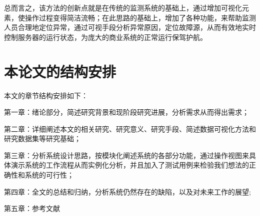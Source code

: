 总而言之，该方法的创新点就是在传统的监测系统的基础上，通过增加可视化元素，使操作过程变得简洁流畅；在此思路的基础上，增加了各种功能，来帮助监测人员合理地定位异常，通过可视手段分析异常原因，定位故障源，从而有效地实时控制服务器的运行状态，为庞大的商业系统的正常运行保驾护航。

\section{本论文的结构安排}
本文的章节结构安排如下：

第一章：绪论部分，简述研究背景和现阶段研究进展，分析需求从而得出需求；

第二章：详细阐述本文的相关研究、研究意义、研究手段、简述数据可视化方法和研究数据集等研究基础；

第三章：分析系统设计思路，按模块化阐述系统的各部分功能，通过操作视图来具体演示系统的工作流程从而实例化分析，并且加入了测试用例来检验我们想法的正确性和系统的可行性；

第四章：全文的总结和归纳，分析系统仍然存在的缺陷，以及对未来工作的展望;

第五章：参考文献

\newpage
